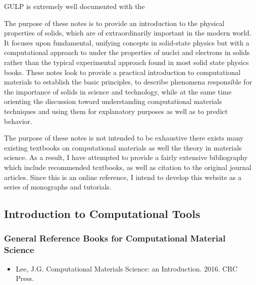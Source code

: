 \documentclass[letterpaper,10pt,english]{sphinxmanual}
\begin{document}
GULP is extremely well documented with the 

The purpose of these notes is to provide an introduction to the physical properties of solids, which are of extraordinarily important in the modern world.  It focuses upon fundamental, unifying concepts in solid-state physics but with a computational approach to under the properties of nuclei and electrons in solids rather than the typical experimental approach found in most solid state physics books.  These notes look to provide a practical introduction to computational materials to establish the basic principles, to describe phenomena responsible for the importance of solids in science and technology, while at the same time orienting the discussion toward understanding computational materials techniques and using them for explanatory purposes as well as to predict behavior.

The purpose of these notes is not intended to be exhaustive there exists many existing textbooks on computational materials as well the theory in materials science.  As a result, I have attempted to provide a fairly extensive bibliography which include recommended textbooks, as well as citation to the original journal articles.  Since this is an online reference, I intend to develop this website as a series of monographs and tutorials.


\subsection{Introduction to Computational Tools}
\label{\detokenize{computational_simulation_tools:introduction-to-computational-tools}}

\subsubsection{General Reference Books for Computational Material Science}
\label{\detokenize{computational_simulation_tools:general-reference-books-for-computational-material-science}}\begin{itemize}
\item {} 
\label{\detokenize{computational_simulation_tools:id1}}{\hyperref[\detokenize{computational_simulation_tools:lee2016-book-comp-mse}]{\sphinxcrossref{{[}Lee16{]}}}} Lee, J.G.  Computational Materials Science: an Introduction. 2016. CRC Press.

\end{itemize}
\end{document}
